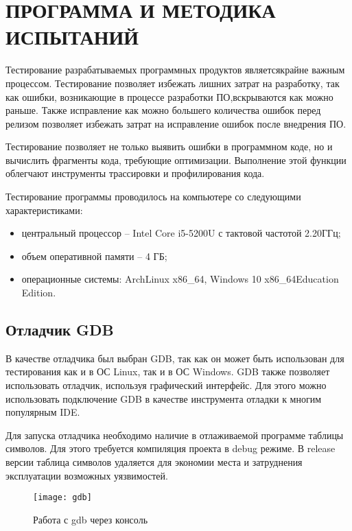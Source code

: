 \section{ПРОГРАММА И МЕТОДИКА ИСПЫТАНИЙ}
\label{sec:test}
Тестирование разрабатываемых программных продуктов является\break крайне важным процессом. Тестирование позволяет избежать
лишних затрат на разработку, так как ошибки, возникающие в процессе разработки ПО,\break вскрываются как можно раньше. Также
исправление как можно большего количества ошибок перед релизом позволяет избежать затрат на исправление ошибок после
внедрения ПО.

Тестирование позволяет не только выявить ошибки в программном коде, но и вычислить фрагменты кода, требующие
оптимизации. Выполнение этой функции облегчают инструменты трассировки и профилирования кода.

Тестирование программы проводилось на компьютере со следующими характеристиками:
\begin{itemize}
	\item центральный процессор -- Intel Core i5-5200U с тактовой частотой 2.20ГГц;
	\item объем оперативной памяти -- 4 ГБ;
	\item операционные системы: ArchLinux x86\_64, Windows 10 x86\_64\break Education Edition.
\end{itemize}

\subsection{Отладчик GDB}
\label{sec:test:gdb_debug}
В качестве отладчика был выбран GDB, так как он может быть использован для тестирования как и в ОС Linux, так и в ОС
Windows. GDB также позволяет использовать отладчик, используя графический интерфейс. Для этого можно использовать
подключение GDB в качестве инструмента отладки к многим популярным IDE.

Для запуска отладчика необходимо наличие в отлаживаемой программе таблицы символов. Для этого требуется компиляция
проекта в debug режиме. В release версии таблица символов удаляется для экономии места и затруднения эксплуатации
возможных уязвимостей.
\begin{figure}[htb]
	\centering
	\texttt{[image: gdb]}
	\caption{Работа с gdb через консоль}
	\label{fig:test:gdb_debug:gdb}
\end{figure}

